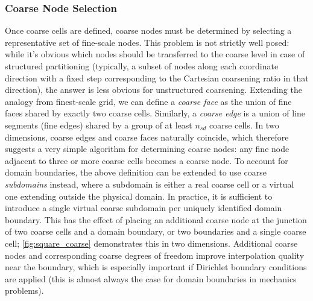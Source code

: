 \subsubsection{Coarse Node Selection}

Once coarse cells are defined, coarse nodes must be determined by selecting a representative set of fine-scale nodes.   This problem is not strictly well posed: while it's obvious which nodes should be transferred to the coarse level in case of structured partitioning (typically, a subset of nodes along each coordinate direction with a fixed step corresponding to the Cartesian coarsening ratio in that direction), the answer is less obvious for unstructured coarsening.   Extending the analogy from finest-scale grid, we can define a \textit{coarse face} as the union of fine faces shared by exactly two coarse cells.   Similarly, a \textit{coarse edge} is a union of line segments (fine edges) shared by a group of at least $n_{sd}$ coarse cells.   In two dimensions, coarse edges and coarse faces naturally coincide, which therefore suggests a very simple algorithm for determining coarse nodes: any fine node adjacent to three or more coarse cells becomes a coarse node.   To account for domain boundaries, the above definition can be extended to use coarse \textit{subdomains} instead, where a subdomain is either a real coarse cell or a virtual one extending outside the physical domain.   In practice, it is sufficient to introduce a single virtual coarse subdomain per uniquely identified domain boundary.   This has the effect of placing an additional coarse node at the junction of two coarse cells and a domain boundary, or two boundaries and a single coarse cell; \cref{fig:square_coarse} demonstrates this in two dimensions.   Additional coarse nodes and corresponding coarse degrees of freedom improve interpolation quality near the boundary, which is especially important if Dirichlet boundary conditions are applied (this is almost always the case for domain boundaries in mechanics problems).

